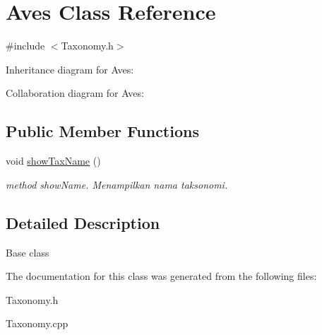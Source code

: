 \hypertarget{classAves}{}\section{Aves Class Reference}
\label{classAves}


{\ttfamily \#include $<$Taxonomy.\+h$>$}



Inheritance diagram for Aves\+:


Collaboration diagram for Aves\+:
\subsection*{Public Member Functions}
\begin{DoxyCompactItemize}
\item 
void \hyperlink{classAves_ad714c106a9b2d932ffb9fbac8b820afd}{show\+Tax\+Name} ()\hypertarget{classAves_ad714c106a9b2d932ffb9fbac8b820afd}{}\label{classAves_ad714c106a9b2d932ffb9fbac8b820afd}

\begin{DoxyCompactList}\small\item\em method show\+Name. Menampilkan nama taksonomi. \end{DoxyCompactList}\end{DoxyCompactItemize}


\subsection{Detailed Description}
Base class 

The documentation for this class was generated from the following files\+:\begin{DoxyCompactItemize}
\item 
Taxonomy.\+h\item 
Taxonomy.\+cpp\end{DoxyCompactItemize}
